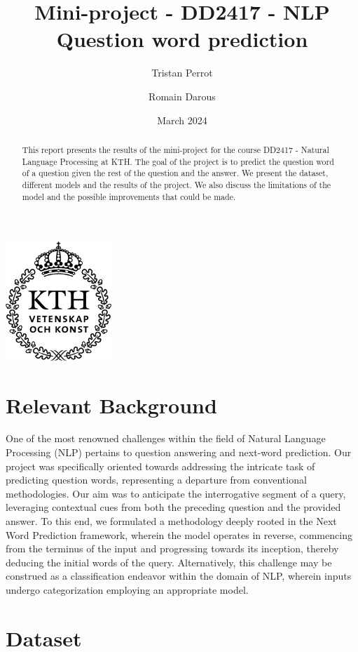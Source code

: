 \documentclass{article}
\title{Mini-project - DD2417 - NLP \\ Question word prediction}
\author{Tristan Perrot \and Romain Darous}
\date{March 2024}
\begin{document}
\maketitle
\begin{center}
    \includegraphics[width = 40mm]{images/KTH_logo_RGB_svart.png}
\end{center}

\begin{abstract}
    This report presents the results of the mini-project for the course DD2417 - Natural Language Processing at KTH. The goal of the project is to predict the question word of a question given the rest of the question and the answer. We present the dataset, different models and the results of the project. We also discuss the limitations of the model and the possible improvements that could be made.
\end{abstract}

\section{Relevant Background}

One of the most renowned challenges within the field of Natural Language Processing (NLP) pertains to question answering and next-word prediction. Our project was specifically oriented towards addressing the intricate task of predicting question words, representing a departure from conventional methodologies. Our aim was to anticipate the interrogative segment of a query, leveraging contextual cues from both the preceding question and the provided answer. To this end, we formulated a methodology deeply rooted in the Next Word Prediction framework, wherein the model operates in reverse, commencing from the terminus of the input and progressing towards its inception, thereby deducing the initial words of the query. Alternatively, this challenge may be construed as a classification endeavor within the domain of NLP, wherein inputs undergo categorization employing an appropriate model.

\section{Dataset}
\end{document}
